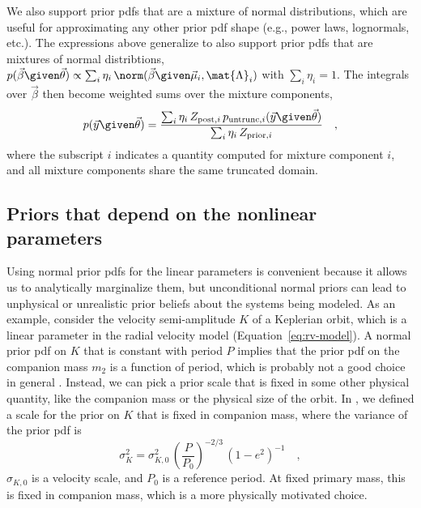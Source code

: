 \documentclass[twocolumn]{AASTeX7/aastex701}
\begin{document}
We also support prior pdfs that are a mixture of normal distributions, which are useful
for approximating any other prior pdf shape (e.g., power laws, lognormals, etc.).
The expressions above generalize to also support prior pdfs that are mixtures of normal
distribtions, $p(\vec{\beta} \given \vec{\theta}) \propto \sum_i \eta_i\,
\norm(\vec{\beta} \given \vec{\mu}_i, \mat{\Lambda}_i)$ with $\sum_i \eta_i = 1$.
The integrals over $\vec{\beta}$ then become weighted sums over the mixture components,
\begin{equation}
  p(\vec{y} \given \vec{\theta}) =
    \frac{\sum_i \eta_i\,Z_{{\rm post},i}\,
      p_{{\rm untrunc},i}(\vec{y} \given \vec{\theta})}
    {\sum_i \eta_i\,Z_{{\rm prior},i}}
  \quad ,
  \label{eq:mixture}
\end{equation}
where the subscript $i$ indicates a quantity computed for mixture component $i$, and all
mixture components share the same truncated domain.


\subsection{Priors that depend on the nonlinear parameters}
\label{sec:methods-priors-nonlinear}

Using normal prior pdfs for the linear parameters is convenient because it allows us to
analytically marginalize them, but unconditional normal priors can lead to unphysical or
unrealistic prior beliefs about the systems being modeled.
As an example, consider the velocity semi-amplitude $K$ of a Keplerian orbit, which is a
linear parameter in the radial velocity model (Equation~\ref{eq:rv-model}).
A normal prior pdf on $K$ that is constant with period $P$ implies that the prior pdf on
the companion mass $m_2$ is a function of period, which is probably not a good choice in
general \citep{Price-Whelan:2020}.
Instead, we can pick a prior scale that is fixed in some other physical quantity, like
the companion mass or the physical size of the orbit.
In \citet{Price-Whelan:2020}, we defined a scale for the prior on $K$ that is fixed in
companion mass, where the variance of the prior pdf is
\begin{equation}
  \sigma_K^2 = \sigma_{K,0}^2\,\left(\frac{P}{P_0}\right)^{-2/3}\,(1 - e^2)^{-1}
  \quad ,
  \label{eq:sigma-K}
\end{equation}
$\sigma_{K,0}$ is a velocity scale, and $P_0$ is a reference period.
At fixed primary mass, this is fixed in companion mass, which is a more physically
motivated choice.
\end{document}
